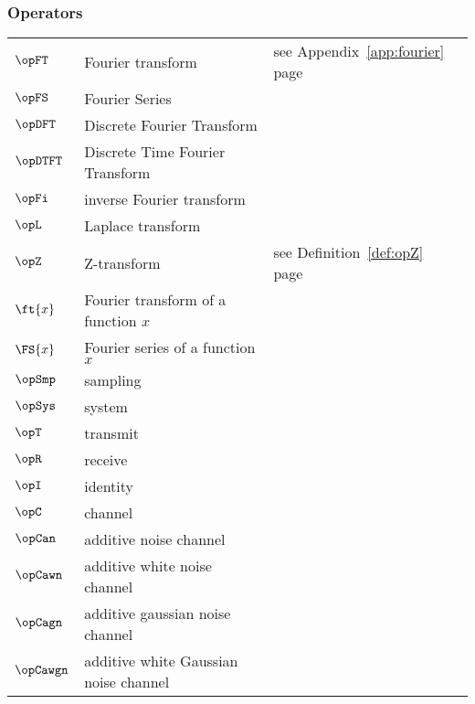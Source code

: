 \subsubsection*{Operators\footnotemark}
\begin{tabular}[t]{lll}
   $\opFT$   & Fourier transform           & see Appendix~\ref{app:fourier} page~\pageref{app:fourier}\\
   $\opFS$   & Fourier Series   \\
   $\opDFT$  & Discrete Fourier Transform   \\
   $\opDTFT$ & Discrete Time Fourier Transform   \\
   $\opFi$   & inverse Fourier transform  \\
   $\opL $   & Laplace transform           \\
   $\opZ $   & Z-transform                 & see Definition~\ref{def:opZ} page~\pageref{def:opZ}\\
   $\ft{x}$  & Fourier transform of a function $x$ \\
   $\FS{x}$  & Fourier series of a function $x$ \\
   $\opSmp$  & sampling \\
   $\opSys$  & system   \\
   $\opT$    & transmit \\
   $\opR$    & receive \\
   $\opI$    & identity \\
   $\opC$    & channel  \\
   $\opCan$  & additive noise channel  \\
   $\opCawn$ & additive white noise channel  \\
   $\opCagn$ & additive gaussian noise channel  \\
   $\opCawgn$& additive white Gaussian noise channel  \\
\end{tabular}

